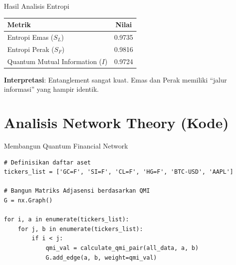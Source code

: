\documentclass[aspectratio=169]{beamer}
\begin{document}
\begin{frame}{Hasil Analisis Entropi}
    \begin{table}
        \centering
        \begin{tabular}{lc}
            \toprule
            \textbf{Metrik} & \textbf{Nilai} \\
            \midrule
            Entropi Emas ($S_L$) & 0.9735 \\
            Entropi Perak ($S_F$) & 0.9816 \\
            Quantum Mutual Information ($I$) & 0.9724 \\
            \bottomrule
        \end{tabular}
    \end{table}
    
    \vspace{0.5cm}
    
    \textbf{Interpretasi}: Entanglement sangat kuat. Emas dan Perak memiliki ``jalur informasi'' yang hampir identik.
\end{frame}

\section{Analisis Network Theory (Kode)}

\begin{frame}[fragile]{Membangun Quantum Financial Network}
\begin{lstlisting}
# Definisikan daftar aset
tickers_list = ['GC=F', 'SI=F', 'CL=F', 'HG=F', 'BTC-USD', 'AAPL']

# Bangun Matriks Adjasensi berdasarkan QMI
G = nx.Graph()

for i, a in enumerate(tickers_list):
    for j, b in enumerate(tickers_list):
        if i < j:
            qmi_val = calculate_qmi_pair(all_data, a, b)
            G.add_edge(a, b, weight=qmi_val)
\end{lstlisting}
\end{frame}
\end{document}
